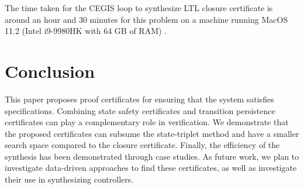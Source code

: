\documentclass[acmlarge]{acmart}
\begin{document}
The time taken for the CEGIS loop to synthesize LTL closure certificate is around an hour and 30 minutes for this problem on a machine running MacOS 11.2 (Intel i9-9980HK with 64 GB of RAM) \cite{murali2024closure}.


\section{Conclusion}
This paper proposes proof certificates for ensuring that the system satisfies specifications.  
Combining state safety certificates and transition persistence certificates can play a complementary role in verification. We demonstrate that the proposed certificates can subsume the state-triplet method and have a smaller search space compared to the closure certificate. Finally, the efficiency of the synthesis has been demonstrated through case studies.
As future work, we plan to investigate data-driven approaches to find these certificates, as well as investigate their use in synthesizing controllers.
\end{document}
